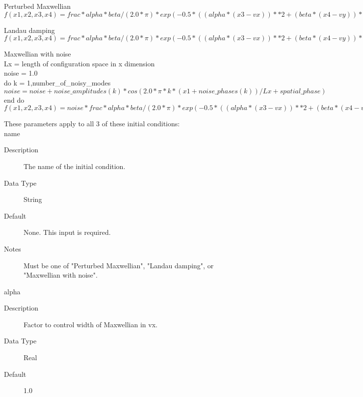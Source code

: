 \documentclass[11pt]{amsart}
\begin{document}
Perturbed Maxwellian \\
\begin{math}f(x1,x2,x3,x4) = frac*alpha*beta/(2.0*\pi)*
  exp(-0.5*((alpha*(x3-vx))**2+(beta*(x4-vy))**2))*
  (1.0+A*cos(kx1*x1+spatial\_phase)*cos(ky1*x2+spatial\_phase)+
       B*cos(kx2*x1+spatial\_phase)+C*cos(ky2*x2+spatial\_phase))\end{math}

Landau damping \\
\begin{math}f(x1,x2,x3,x4) = frac*alpha*beta/(2.0*\pi)*
  exp(-0.5*((alpha*(x3-vx))**2+(beta*(x4-vy))**2))*
  (1.0+A*cos(kx1*x1+ky1*x2+spatial\_phase))\end{math}

Maxwellian with noise \\
Lx = length of configuration space in x dimension \\
noise = 1.0 \\
do k = 1,number\_of\_noisy\_modes \\
\indent \begin {math} noise = noise+noise\_amplitudes(k)*cos(2.0*\pi*k*(x1+noise\_phases(k))/Lx+spatial\_phase) \end{math} \\
end do \\
\begin{math}f(x1,x2,x3,x4) = noise*frac*alpha*beta/(2.0*\pi)*
  exp(-0.5*((alpha*(x3-vx))**2+(beta*(x4-vy))**2))\end{math}

These parameters apply to all 3 of these initial conditions: \\
\indent name
\begin{description}
\item [Description] The name of the initial condition.
\item [Data Type] String
\item [Default] None.  This input is required.
\item [Notes] Must be one of "Perturbed Maxwellian", "Landau damping", or
"Maxwellian with noise".
\end{description}

alpha
\begin{description}
\item [Description] Factor to control width of Maxwellian in vx.
\item [Data Type] Real
\item [Default] 1.0
\end{description}
\end{document}
